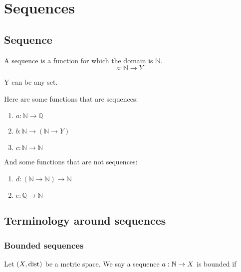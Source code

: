 \section{Sequences}

\subsection{Sequence}
\begin{definition}[Sequence]
    A sequence is a function for which the domain is $\mathbb{N}$.
    $$a: \mathbb{N} \to Y$$

    Y can be any set.
\end{definition}

\begin{example}
    Here are some functions that are sequences:
    \begin{enumerate}
        \item $a: \mathbb{N} \to \mathbb{Q}$
        \item $b: \mathbb{N} \to (\mathbb{N} \to Y)$
        \item $c: \mathbb{N} \to \mathbb{N}$
    \end{enumerate}

    And some functions that are not sequences:
    \begin{enumerate}
        \item $d: (\mathbb{N} \to \mathbb{N}) \to \mathbb{N}$
        \item $e: \mathbb{Q} \to \mathbb{N}$
    \end{enumerate}
\end{example}

\subsection{Terminology around sequences}
\subsubsection{Bounded sequences}
\begin{definition}
    Let $(X, \text{dist})$ be a metric space. We say a sequence $a: \mathbb{N} \to X$ is bounded if
    \begin{myCenter}
    \end{myCenter}
\end{definition}

